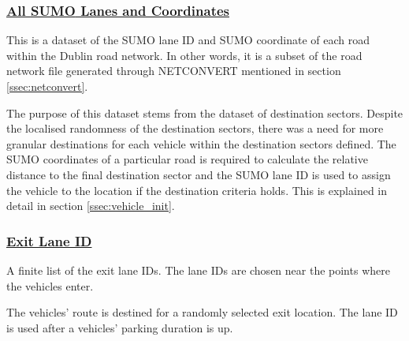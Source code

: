\subsubsection{\underline{All \ac{SUMO} Lanes and Coordinates}}
\begin{description}[leftmargin=8em,style=nextline]
  \item[Explanation] This is a dataset of the \ac{SUMO} lane ID and \ac{SUMO} coordinate of each road within the Dublin road network. In other words, it is a subset of the road network file generated through NETCONVERT mentioned in section \ref{ssec:netconvert}.
  \item[Purpose] The purpose of this dataset stems from the dataset of destination sectors. Despite the localised randomness of the destination sectors, there was a need for more granular destinations for each vehicle within the destination sectors defined. The \ac{SUMO} coordinates of a particular road is required to calculate the relative distance to the final destination sector and the \ac{SUMO} lane ID is used to assign the vehicle to the location if the destination criteria holds. This is explained in detail in section \ref{ssec:vehicle_init}.
\end{description}

\subsubsection{\underline{Exit Lane ID}}
\begin{description}[leftmargin=8em,style=nextline]
  \item[Explanation] A finite list of the exit lane IDs. The lane IDs are chosen near the points where the vehicles enter.
  \item[Purpose] The vehicles' route is destined for a randomly selected exit location. The lane ID is used after a vehicles' parking duration is up.
\end{description}

